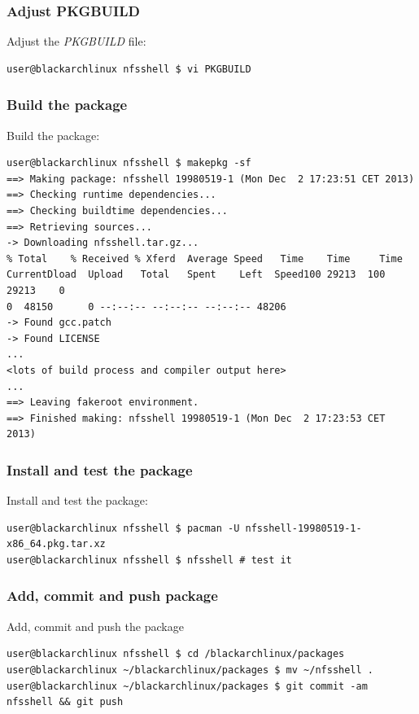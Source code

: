 \documentclass[a4paper, oneside, 11pt]{book}
\begin{document}
\subsubsection{Adjust PKGBUILD}
Adjust the \textit{PKGBUILD} file:
{\small
\color{gray}
\begin{verbatim}
user@blackarchlinux nfsshell $ vi PKGBUILD
\end{verbatim}
}

\subsubsection{Build the package}
Build the package:
{\small
\color{gray}
\begin{verbatim}
user@blackarchlinux nfsshell $ makepkg -sf
==> Making package: nfsshell 19980519-1 (Mon Dec  2 17:23:51 CET 2013)
==> Checking runtime dependencies...
==> Checking buildtime dependencies...
==> Retrieving sources...
-> Downloading nfsshell.tar.gz...
% Total    % Received % Xferd  Average Speed   Time    Time     Time
CurrentDload  Upload   Total   Spent    Left  Speed100 29213  100 29213    0
0  48150      0 --:--:-- --:--:-- --:--:-- 48206
-> Found gcc.patch
-> Found LICENSE
...
<lots of build process and compiler output here>
...
==> Leaving fakeroot environment.
==> Finished making: nfsshell 19980519-1 (Mon Dec  2 17:23:53 CET 2013)
\end{verbatim}
}

\subsubsection{Install and test the package}
Install and test the package:
{\small
\color{gray}
\begin{verbatim}
user@blackarchlinux nfsshell $ pacman -U nfsshell-19980519-1-x86_64.pkg.tar.xz
user@blackarchlinux nfsshell $ nfsshell # test it
\end{verbatim}
}

\subsubsection{Add, commit and push package}
Add, commit and push the package
{\small
\color{gray}
\begin{verbatim}
user@blackarchlinux nfsshell $ cd /blackarchlinux/packages
user@blackarchlinux ~/blackarchlinux/packages $ mv ~/nfsshell .
user@blackarchlinux ~/blackarchlinux/packages $ git commit -am nfsshell && git push
\end{verbatim}
}
\end{document}
